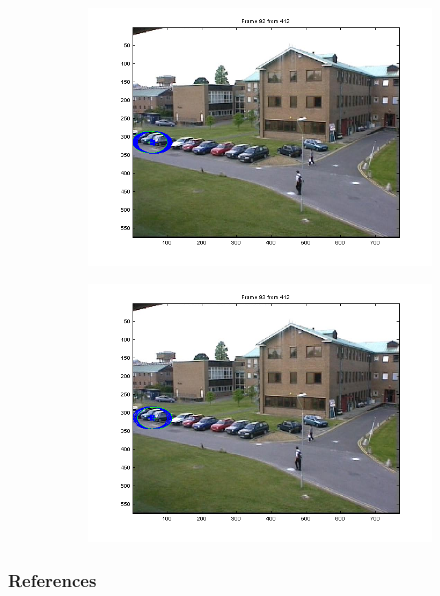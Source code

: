 \documentclass[hyperref={pdfpagelabels=false}]{beamer}
\begin{document}
\begin{frame}
\begin{figure}
\begin{subfigure}[b]{0.3\textwidth}
                 \includegraphics[width=\textwidth]{results/PETS01D1Human1car/Frame0092.png}
         \end{subfigure}
         \begin{subfigure}[b]{0.3\textwidth}
                 \includegraphics[width=\textwidth]{results/PETS01D1Human1car/Frame0093.png}
         \end{subfigure}
\end{figure}         

\end{frame}

\begin{frame}[allowframebreaks]
	\frametitle{References}
	\nocite{KernelBasedObjectTracking}
	\nocite{MeanShift}	
	
	
\end{frame}
\end{document}
